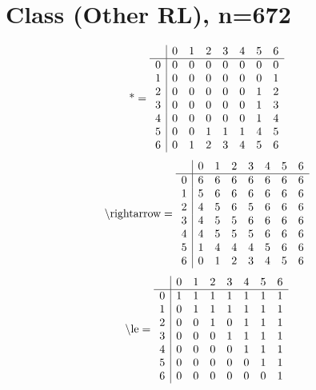 \documentclass[11pt]{article}
\begin{document}
\section{Class (Other RL), n=672}
\[\text{*} = 
\begin{array}{r | r r r r r r r}
 & 0 & 1 & 2 & 3 & 4 & 5 & 6 \\ \hline
0 & 0 & 0 & 0 & 0 & 0 & 0 & 0 \\
1 & 0 & 0 & 0 & 0 & 0 & 0 & 1 \\
2 & 0 & 0 & 0 & 0 & 0 & 1 & 2 \\
3 & 0 & 0 & 0 & 0 & 0 & 1 & 3 \\
4 & 0 & 0 & 0 & 0 & 0 & 1 & 4 \\
5 & 0 & 0 & 1 & 1 & 1 & 4 & 5 \\
6 & 0 & 1 & 2 & 3 & 4 & 5 & 6 \\
\end{array}
\]
\[\text{\textbackslash rightarrow} = 
\begin{array}{r | r r r r r r r}
 & 0 & 1 & 2 & 3 & 4 & 5 & 6 \\ \hline
0 & 6 & 6 & 6 & 6 & 6 & 6 & 6 \\
1 & 5 & 6 & 6 & 6 & 6 & 6 & 6 \\
2 & 4 & 5 & 6 & 5 & 6 & 6 & 6 \\
3 & 4 & 5 & 5 & 6 & 6 & 6 & 6 \\
4 & 4 & 5 & 5 & 5 & 6 & 6 & 6 \\
5 & 1 & 4 & 4 & 4 & 5 & 6 & 6 \\
6 & 0 & 1 & 2 & 3 & 4 & 5 & 6 \\
\end{array}
\]
\[\text{\textbackslash le} = 
\begin{array}{r | r r r r r r r}
 & 0 & 1 & 2 & 3 & 4 & 5 & 6 \\ \hline
0 & 1 & 1 & 1 & 1 & 1 & 1 & 1 \\
1 & 0 & 1 & 1 & 1 & 1 & 1 & 1 \\
2 & 0 & 0 & 1 & 0 & 1 & 1 & 1 \\
3 & 0 & 0 & 0 & 1 & 1 & 1 & 1 \\
4 & 0 & 0 & 0 & 0 & 1 & 1 & 1 \\
5 & 0 & 0 & 0 & 0 & 0 & 1 & 1 \\
6 & 0 & 0 & 0 & 0 & 0 & 0 & 1 \\
\end{array}
\]
\end{document}
